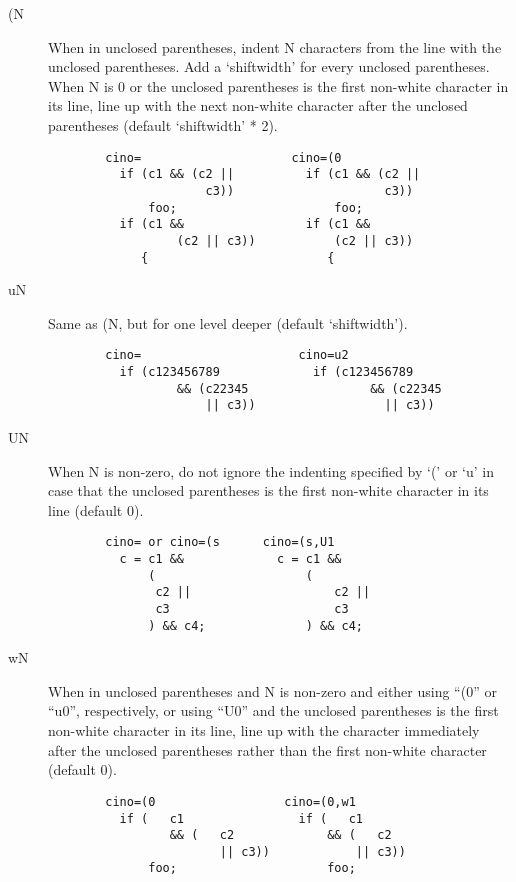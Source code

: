 \begin{description}
    \item[(N]    When in unclosed parentheses, indent N characters from the line
          with the unclosed parentheses.  Add a `shiftwidth' for every
          unclosed parentheses.  When N is 0 or the unclosed parentheses
          is the first non-white character in its line, line up with the
          next non-white character after the unclosed parentheses
          (default `shiftwidth' * 2).
\begin{verbatim}
        cino=                     cino=(0
          if (c1 && (c2 ||          if (c1 && (c2 ||
                      c3))                     c3))
              foo;                      foo;
          if (c1 &&                 if (c1 &&
                  (c2 || c3))           (c2 || c3))
             {                         {
 \end{verbatim}
    \item[uN] Same as (N, but for one level deeper  (default `shiftwidth').
\begin{verbatim}
        cino=                      cino=u2
          if (c123456789             if (c123456789
                  && (c22345                 && (c22345
                      || c3))                  || c3))
 \end{verbatim}
    \item[UN] When N is non-zero, do not ignore the indenting specified by
          `(' or `u' in case that the unclosed parentheses is the first
          non-white character in its line (default 0).
\begin{verbatim}
        cino= or cino=(s      cino=(s,U1
          c = c1 &&             c = c1 &&
              (                     (
               c2 ||                    c2 ||
               c3                       c3
              ) && c4;              ) && c4;
 \end{verbatim}
  \clearpage
    \item[wN] When in unclosed parentheses and N is non-zero and either
          using ``(0'' or ``u0'', respectively, or using ``U0'' and the unclosed
          parentheses is the first non-white character in its line, line
          up with the character immediately after the unclosed parentheses
          rather than the first non-white character (default 0).
\begin{verbatim}
        cino=(0                  cino=(0,w1
          if (   c1                if (   c1
                 && (   c2             && (   c2
                        || c3))            || c3))
              foo;                     foo;

\end{verbatim}
\end{description}
